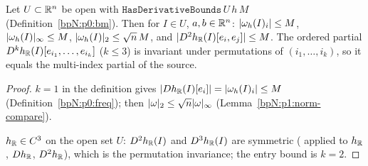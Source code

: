 \begin{lemma}\label{bpN:p1:partials}
Let $U\subset\mathbb{R}^n$ be open with $\texttt{HasDerivativeBounds}\,U\,h\,M$ (Definition~\ref{bpN:p0:bm}). Then for $I\in U$, $a,b\in\mathbb{R}^n$:
$\lvert \omega_h(I)_i\rvert\le M$, $\lvert \omega_h(I)\rvert_\infty\le M$, $\lvert \omega_h(I)\rvert_2\le\sqrt n\,M$, and $\lvert D^2h_{\mathbb{R}}(I)[e_i,e_j]\rvert\le M$. The ordered partial
$D^kh_{\mathbb{R}}(I)[e_{i_1},\dots,e_{i_k}]$ ($k\le3$) is invariant under permutations of $(i_1,\dots,i_k)$, so it equals the multi-index partial of the source.
\end{lemma}
\begin{proof}
\label{stepN:p1:pa-first} $k=1$ in the definition gives $\lvert Dh_{\mathbb{R}}(I)[e_i]\rvert=\lvert \omega_h(I)_i\rvert\le M$ (Definition~\ref{bpN:p0:freq}); then $\lvert \omega\rvert_2\le\sqrt n\lvert \omega\rvert_\infty$ (Lemma~\ref{bpN:p1:norm-compare}).

\label{stepN:p1:pa-sym} $h_{\mathbb{R}}\in C^3$ on the open set $U$: $D^2h_{\mathbb{R}}(I)$ and $D^3h_{\mathbb{R}}(I)$ are symmetric ( applied to $h_{\mathbb{R}}$, $Dh_{\mathbb{R}}$, $D^2h_{\mathbb{R}}$), which is the permutation invariance; the entry bound is $k=2$.
\end{proof}

